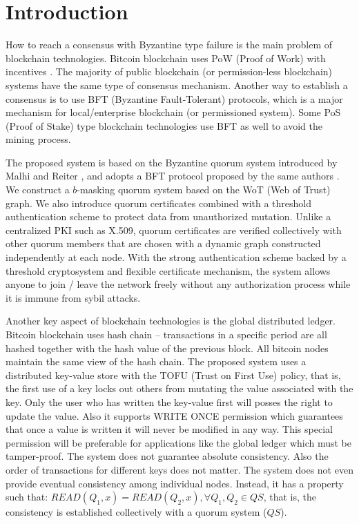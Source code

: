 \section{Introduction}
How to reach a consensus with Byzantine type failure is the main
problem of blockchain technologies. Bitcoin blockchain uses PoW (Proof
of Work) with incentives \cite{bitcoin}. The majority of public
blockchain (or permission-less blockchain) systems have the same type
of consensus mechanism. Another way to establish a consensus is to use
BFT (Byzantine Fault-Tolerant) protocols, which is a major mechanism
for local/enterprise blockchain (or permissioned system). Some PoS
(Proof of Stake) type blockchain technologies use BFT as well to avoid
the mining process.

The proposed system is based on the Byzantine quorum system introduced
by Malhi and Reiter \cite{Delhi:1}, and adopts a BFT protocol proposed
by the same authors \cite{Delhi:2}. We construct a $b$-masking quorum
system based on the WoT (Web of Trust) graph. We also introduce quorum
certificates combined with a threshold authentication scheme to
protect data from unauthorized mutation. Unlike a centralized PKI such
as X.509, quorum certificates are verified collectively with other
quorum members that are chosen with a dynamic graph constructed
independently at each node. With the strong authentication scheme
backed by a threshold cryptosystem and flexible certificate mechanism,
the system allows anyone to join / leave the network freely without
any authorization process while it is immune from sybil attacks.

Another key aspect of blockchain technologies is the global
distributed ledger. Bitcoin blockchain uses hash chain -- transactions
in a specific period are all hashed together with the hash value of
the previous block. All bitcoin nodes maintain the same view of the
hash chain.
The proposed system uses a distributed key-value store with the TOFU
(Trust on First Use) policy, that is, the first use of a key locks out
others from mutating the value associated with the key. Only the
user who has written the key-value first will posses the right to
update the value. Also it supports WRITE ONCE permission which
guarantees that once a value is written it will never be modified in
any way. This special permission will be preferable for applications
like the global ledger which must be tamper-proof.
The system does not guarantee absolute consistency. Also the order of
transactions for different keys does not matter. The system does not
even provide eventual consistency among individual nodes. Instead, it
has a property such that: $READ(Q_1, x) = READ(Q_2, x), \forall Q_1,
Q_2 \in QS$, that is, the consistency is established collectively with
a quorum system ($QS$).

